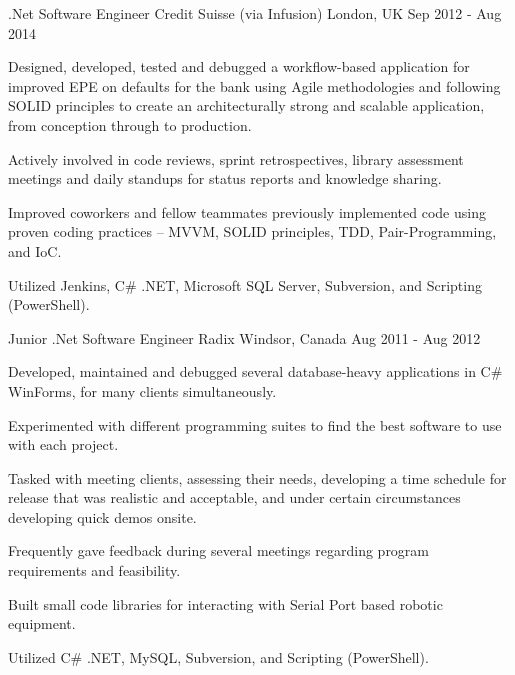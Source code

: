 \begin{cventries}
  \cventry
    {.Net Software Engineer} %
    {Credit Suisse (via Infusion)} %
    {London, UK} %
    {Sep 2012 - Aug 2014} %
    {
      \begin{cvitems} %
        \item {Designed, developed, tested and debugged a workflow-based application for improved EPE on defaults for the bank using Agile methodologies and following SOLID principles to create an architecturally strong and scalable application, from conception through to production.}
        \item {Actively involved in code reviews, sprint retrospectives, library assessment meetings and daily standups for status reports and knowledge sharing.}
        \item {Improved coworkers and fellow teammates previously implemented code using proven coding practices – MVVM, SOLID principles, TDD, Pair-Programming, and IoC.}
        \item {Utilized Jenkins, C\# .NET, Microsoft SQL Server, Subversion, and Scripting (PowerShell).}
      \end{cvitems}
    }

  \cventry
    {Junior .Net Software Engineer} %
    {Radix} %
    {Windsor, Canada} %
    {Aug 2011 - Aug 2012} %
    {
      \begin{cvitems} %
        \item {Developed, maintained and debugged several database-heavy applications in C\# WinForms, for many clients simultaneously.}
        \item {Experimented with different programming suites to find the best software to use with each project.}
        \item {Tasked with meeting clients, assessing their needs, developing a time schedule for release that was realistic and acceptable, and under certain circumstances developing quick demos onsite.}
        \item {Frequently gave feedback during several meetings regarding program requirements and feasibility.}
        \item {Built small code libraries for interacting with Serial Port based robotic equipment.}
        \item {Utilized C\# .NET, MySQL, Subversion, and Scripting (PowerShell).}
      \end{cvitems}
    }

\end{cventries}
